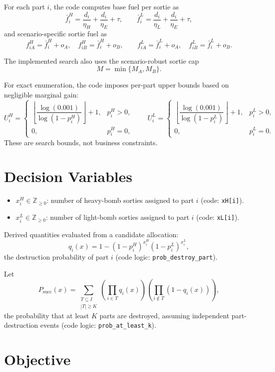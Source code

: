 For each part $i$, the code computes base fuel per sortie as
\[
\bar f_i^H = \frac{d_i}{\eta_H} + \frac{d_i}{\eta_E} + \tau,
\qquad
\bar f_i^L = \frac{d_i}{\eta_L} + \frac{d_i}{\eta_E} + \tau,
\]
and scenario-specific sortie fuel as
\[
f_{iA}^H=\bar f_i^H+o_A,\quad f_{iB}^H=\bar f_i^H+o_B,
\qquad
f_{iA}^L=\bar f_i^L+o_A,\quad f_{iB}^L=\bar f_i^L+o_B.
\]

The implemented search also uses the scenario-robust sortie cap
\[
M = \min\{M_A,M_B\}.
\]

For exact enumeration, the code imposes per-part upper bounds based on negligible marginal gain:
\[
U_i^H =
\begin{cases}
\left\lfloor \dfrac{\log(0.001)}{\log(1-p_i^H)} \right\rfloor + 1, & p_i^H>0,\\[1ex]
0, & p_i^H=0,
\end{cases}
\qquad
U_i^L =
\begin{cases}
\left\lfloor \dfrac{\log(0.001)}{\log(1-p_i^L)} \right\rfloor + 1, & p_i^L>0,\\[1ex]
0, & p_i^L=0.
\end{cases}
\]
These are search bounds, not business constraints.

\section*{Decision Variables}

\begin{itemize}
    \item $x_i^H \in \mathbb{Z}_{\ge 0}$: number of heavy-bomb sorties assigned to part $i$ (code: \texttt{xH[i]}).
    \item $x_i^L \in \mathbb{Z}_{\ge 0}$: number of light-bomb sorties assigned to part $i$ (code: \texttt{xL[i]}).
\end{itemize}

Derived quantities evaluated from a candidate allocation:
\[
q_i(x)=1-(1-p_i^H)^{x_i^H}(1-p_i^L)^{x_i^L},
\]
the destruction probability of part $i$ (code logic: \texttt{prob\_destroy\_part}).

Let
\[
P_{\mathrm{succ}}(x)
=
\sum_{\substack{T\subseteq I\\|T|\ge K}}
\left(\prod_{i\in T} q_i(x)\right)
\left(\prod_{i\notin T} (1-q_i(x))\right),
\]
the probability that at least $K$ parts are destroyed, assuming independent part-destruction events (code logic: \texttt{prob\_at\_least\_k}).

\section*{Objective}

